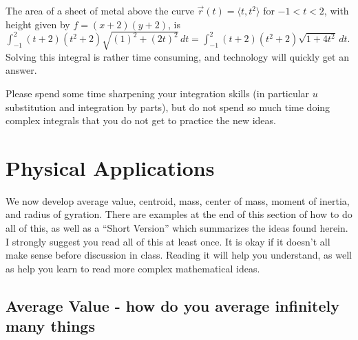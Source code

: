 \begin{example}
%
The area of a sheet of metal above the curve $\vec
r(t)=\langle t,t^2\rangle$ for $-1<t<2$, with height given by
{$f=(x+2)(y+2)$}, is 
$\int_{-1}^{2}(t+2)(t^2+2)\sqrt{(1)^2+(2t)^2}\,dt 
= \int_{-1}^{2} (t+2)(t^2+2)\sqrt{1+4t^2}\,dt$. Solving this integral is
rather time consuming, and technology will quickly get an answer.
\end{example}

Please spend some time sharpening your integration skills (in
particular $u$ substitution and integration by parts), but do not
spend so much time doing complex integrals that you do not get to
practice the new ideas.


\section{Physical Applications}
We now develop average value, centroid, mass, center of mass, moment
of inertia, and radius of gyration. There are examples at the end of
this section of how to do all of this, as well as a ``Short Version''
which summarizes the ideas found herein. I strongly suggest you read
all of this at least once. It is okay if it doesn't all make sense
before discussion in class.  Reading it will help you understand, as
well as help you learn to read more complex mathematical ideas. 

\subsection{Average Value - how do you average infinitely many things}

